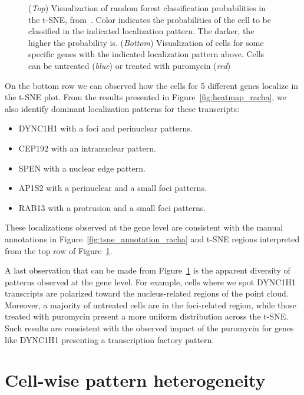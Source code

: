 \begin{figure}[h]
	\endminipage
	\caption[Cell-wise localization pattern classification results]{(\textit{Top}) Visualization of random forest classification probabilities in the t-SNE, from~\cite{CHOUAIB_2020}.
	Color indicates the probabilities of the cell to be classified in the indicated localization pattern.
	The darker, the higher the probability is.
	(\textit{Bottom}) Visualization of cells for some specific genes with the indicated localization pattern above.
	Cells can be untreated (\textit{blue}) or treated with puromycin (\textit{red})}
	\label{fig:tsne_proba_gene}
\end{figure}

On the bottom row we can observed how the cells for 5 different genes localize in the \ac{t-SNE} plot.
From the results presented in Figure~\ref{fig:heatmap_racha}, we also identify dominant localization patterns for these transcripts:
\begin{itemize}
	\setlength\itemsep{0.1em}
	\item DYNC1H1 with a foci and perinuclear patterns.
	\item CEP192 with an intranuclear pattern.
	\item SPEN with a nuclear edge pattern.
	\item AP1S2 with a perinuclear and a small foci patterns.
	\item RAB13 with a protrusion and a small foci patterns.
\end{itemize}

\noindent
These localizations observed at the gene level are consistent with the manual annotations in Figure~\ref{fig:tsne_annotation_racha} and \ac{t-SNE} regions interpreted from the top row of Figure~\ref{fig:tsne_proba_gene}.

A last observation that can be made from Figure~\ref{fig:tsne_proba_gene} is the apparent diversity of patterns observed at the gene level.
For example, cells where we spot DYNC1H1 transcripts are polarized toward the nucleus-related regions of the point cloud.
Moreover, a majority of untreated cells are in the foci-related region, while those treated with puromycin present a more uniform distribution across the \ac{t-SNE}.
Such results are consistent with the observed impact of the puromycin for genes like DYNC1H1 presenting a transcription factory pattern.

\section{Cell-wise pattern heterogeneity}
\label{sec:pattern_heterogeneity}

